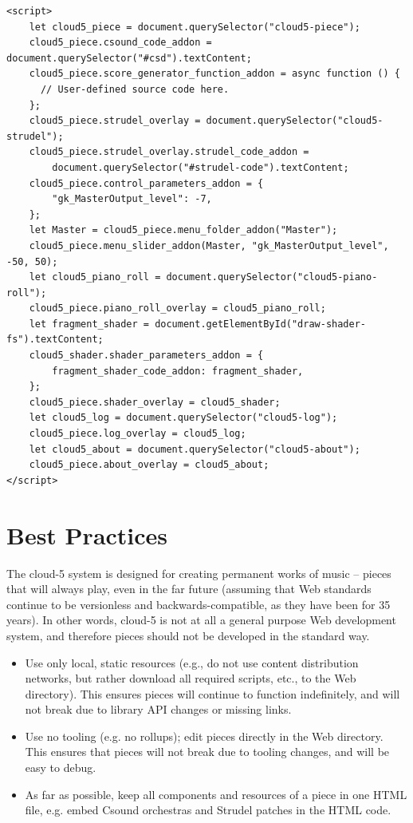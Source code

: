 \documentclass[runningheads,a4paper]{llncs}
\begin{document}
\begin{verbatim}
<script>
    let cloud5_piece = document.querySelector("cloud5-piece");
    cloud5_piece.csound_code_addon = document.querySelector("#csd").textContent;
    cloud5_piece.score_generator_function_addon = async function () {
      // User-defined source code here.
    };
    cloud5_piece.strudel_overlay = document.querySelector("cloud5-strudel");
    cloud5_piece.strudel_overlay.strudel_code_addon = 
        document.querySelector("#strudel-code").textContent;
    cloud5_piece.control_parameters_addon = {
        "gk_MasterOutput_level": -7,
    };
    let Master = cloud5_piece.menu_folder_addon("Master");
    cloud5_piece.menu_slider_addon(Master, "gk_MasterOutput_level", -50, 50);
    let cloud5_piano_roll = document.querySelector("cloud5-piano-roll");
    cloud5_piece.piano_roll_overlay = cloud5_piano_roll;
    let fragment_shader = document.getElementById("draw-shader-fs").textContent;
    cloud5_shader.shader_parameters_addon = {
        fragment_shader_code_addon: fragment_shader,
    };
    cloud5_piece.shader_overlay = cloud5_shader;
    let cloud5_log = document.querySelector("cloud5-log");
    cloud5_piece.log_overlay = cloud5_log;
    let cloud5_about = document.querySelector("cloud5-about");
    cloud5_piece.about_overlay = cloud5_about;
</script>
\end{verbatim}

\section{Best Practices}

The cloud-5 system is designed for creating permanent works of music -- pieces that will always play, even in the far future (assuming that Web standards continue to be versionless and backwards-compatible, as they have been for 35 years). In other words, cloud-5 is not at all a general purpose Web development system, and therefore pieces should not be developed in the standard way.

\begin{itemize}
\item Use only local, static resources (e.g., do not use content distribution networks, but rather download all required scripts, etc., to the Web directory). This ensures pieces will continue to function indefinitely, and will not break due to library API changes or missing links.
\item Use no tooling (e.g. no rollups); edit pieces directly in the Web directory. This ensures that pieces will not break due to tooling changes, and will be easy to debug.
\item As far as possible, keep all components and resources of a piece in one HTML file, e.g. embed Csound orchestras and Strudel patches in the HTML code.
\end{itemize}
\end{document}
